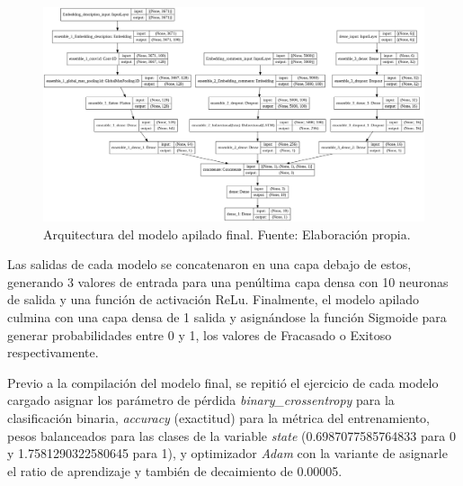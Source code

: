 \begin{figure}[!ht]
	\begin{center}
		\includegraphics[width=1.05\textwidth]{4/figures/final_stacked_model.png}
		\caption{Arquitectura del modelo apilado final. Fuente: Elaboración propia.}
		\label{4:fig41}
	\end{center}
\end{figure}

Las salidas de cada modelo se concatenaron en una capa debajo de estos, generando 3 valores de entrada para una penúltima capa densa con 10 neuronas de salida y una función de activación ReLu. Finalmente, el modelo apilado culmina con una capa densa de 1 salida y asignándose la función Sigmoide para generar probabilidades entre 0 y 1, los valores de Fracasado o Exitoso respectivamente.

Previo a la compilación del modelo final, se repitió el ejercicio de cada modelo cargado asignar los parámetro de pérdida \textit{binary\_crossentropy} para la clasificación binaria, \textit{accuracy} (exactitud) para la métrica del entrenamiento, pesos balanceados para las clases de la variable \textit{state} (0.6987077585764833 para 0 y 1.7581290322580645 para 1), y optimizador \textit{Adam} con la variante de asignarle el ratio de aprendizaje y también de decaimiento de 0.00005.